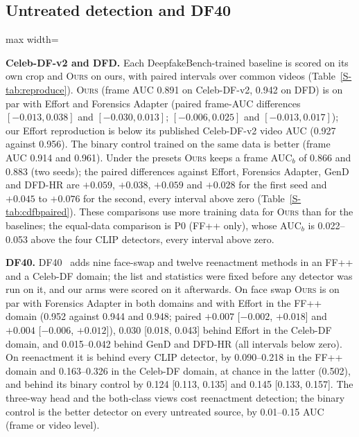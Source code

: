 \documentclass[conference]{IEEEtran}
\newcommand{\ours}{\textsc{Ours}}
\begin{document}
\subsection{Untreated detection and DF40}
\label{sec:detect}
\begin{table}[t]
\centering
\caption{DF40 held-out, untreated: video AUC, mean over nine face-swap (FS) and twelve reenactment (FR) methods, against the
same-domain real videos. All detectors share one crop. Intervals and paired differences in Table~\ref{S-tab:v4df40full}.}
\label{tab:df40}
\footnotesize
\setlength{\tabcolsep}{3pt}
\begin{adjustbox}{max width=\columnwidth}\end{adjustbox}
\end{table}
\textbf{Celeb-DF-v2 and DFD.} Each DeepfakeBench-trained baseline is scored on its own crop and \ours{} on ours, with paired
intervals over common videos (Table~\ref{S-tab:reproduce}). \ours{} (frame AUC 0.891 on Celeb-DF-v2, 0.942 on DFD) is on par
with Effort and Forensics Adapter (paired frame-AUC differences $[-0.013, 0.038]$ and $[-0.030, 0.013]$; $[-0.006, 0.025]$ and
$[-0.013, 0.017]$); our Effort reproduction is below its published Celeb-DF-v2 video AUC (0.927 against 0.956). The binary
control trained on the same data is better (frame AUC 0.914 and 0.961). Under the presets \ours{} keeps a frame AUC$_b$ of 0.866 and 0.883
(two seeds); the paired differences against Effort, Forensics Adapter, GenD and DFD-HR are $+0.059$, $+0.038$, $+0.059$ and $+0.028$ for the first seed and $+0.045$ to $+0.076$ for the second, every interval above zero (Table~\ref{S-tab:cdfbpaired}). These comparisons use more
training data for \ours{} than for the baselines; the equal-data comparison is P0 (FF++ only), whose AUC$_b$ is 0.022--0.053 above
the four CLIP detectors, every interval above zero.

\textbf{DF40.} DF40~\cite{df40} adds nine face-swap and twelve reenactment methods in an FF++ and a Celeb-DF domain; the list
and statistics were fixed before any detector was run on it, and our arms were scored on it afterwards. On face swap \ours{} is
on par with Forensics Adapter in both domains and with Effort in the FF++ domain (0.952 against 0.944 and 0.948; paired
$+0.007$ [$-0.002$, $+0.018$] and $+0.004$ [$-0.006$, $+0.012$]), 0.030 [0.018, 0.043] behind Effort in the Celeb-DF domain, and
0.015--0.042 behind GenD and DFD-HR (all intervals below zero). On reenactment it is behind every CLIP detector, by 0.090--0.218
in the FF++ domain and 0.163--0.326 in the Celeb-DF domain, at chance in the latter (0.502), and behind its binary control by
0.124 [0.113, 0.135] and 0.145 [0.133, 0.157]. The three-way head and the both-class views cost reenactment detection; the
binary control is the better detector on every untreated source, by 0.01--0.15 AUC (frame or video level).
\end{document}

